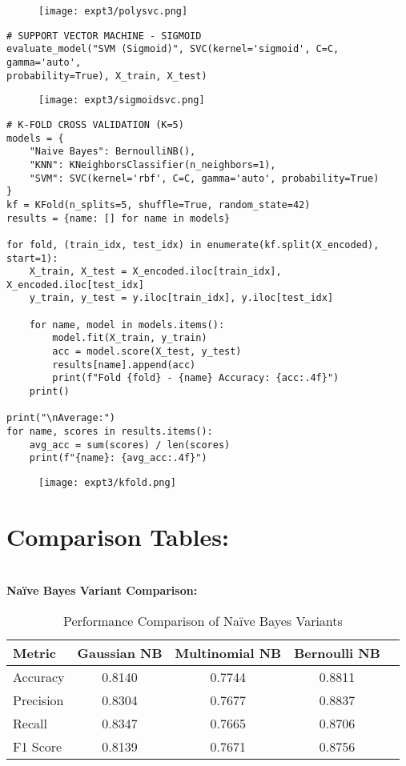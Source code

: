 \documentclass[11pt]{article}
\begin{document}
\begin{figure}[H]
\centering
\texttt{[image: expt3/polysvc.png]} 
\end{figure}

\begin{verbatim}
# SUPPORT VECTOR MACHINE - SIGMOID
evaluate_model("SVM (Sigmoid)", SVC(kernel='sigmoid', C=C, gamma='auto', 
probability=True), X_train, X_test)
\end{verbatim}

\begin{figure}[H]
\centering
\texttt{[image: expt3/sigmoidsvc.png]} 
\end{figure}

\begin{verbatim}
# K-FOLD CROSS VALIDATION (K=5)
models = {
    "Naive Bayes": BernoulliNB(),
    "KNN": KNeighborsClassifier(n_neighbors=1),
    "SVM": SVC(kernel='rbf', C=C, gamma='auto', probability=True)
}
kf = KFold(n_splits=5, shuffle=True, random_state=42)
results = {name: [] for name in models}

for fold, (train_idx, test_idx) in enumerate(kf.split(X_encoded), start=1):
    X_train, X_test = X_encoded.iloc[train_idx], X_encoded.iloc[test_idx]
    y_train, y_test = y.iloc[train_idx], y.iloc[test_idx]

    for name, model in models.items():
        model.fit(X_train, y_train)
        acc = model.score(X_test, y_test)
        results[name].append(acc)
        print(f"Fold {fold} - {name} Accuracy: {acc:.4f}")
    print()

print("\nAverage:")
for name, scores in results.items():
    avg_acc = sum(scores) / len(scores)
    print(f"{name}: {avg_acc:.4f}")
\end{verbatim}

\begin{figure}[H]
\centering
\texttt{[image: expt3/kfold.png]} 
\end{figure}

\noindent
\section{Comparison Tables:} \\
\vspace{0.5cm}
\textbf{Naïve Bayes Variant Comparison:} \\
\begin{table}[h!]
\centering
\begin{tabular}{|l|c|c|c|c|}
\hline
\textbf{Metric} & \textbf{Gaussian NB} & \textbf{Multinomial NB} & \textbf{Bernoulli NB}\\
\hline
Accuracy & 0.8140 & 0.7744 & 0.8811 \\
Precision & 0.8304 & 0.7677 & 0.8837 \\
Recall & 0.8347 & 0.7665 & 0.8706 \\
F1 Score & 0.8139 & 0.7671 & 0.8756 \\
\hline
\end{tabular}
\caption{Performance Comparison of Naïve Bayes Variants}
\end{table}
\end{document}
